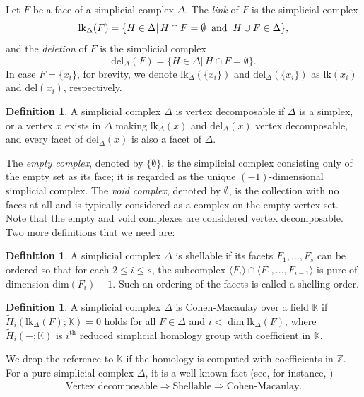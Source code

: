 \documentclass[12pt,reqno]{amsart}
\theoremstyle{definition}
\newtheorem{definition}[proposition]{Definition}
\def\l{\langle}
\def\r{\rangle}
\begin{document}
	Let $F$ be a face of a simplicial complex $\Delta$. The {\it link} of $F$ is the simplicial complex \[\mathrm{lk}_{\Delta}(F)=\{H \in \Delta|\,H \cap F =\emptyset \hspace{2mm}\text{and}\hspace{2mm} H \cup F \in \Delta \},\]
	and the {\it deletion} of $F$ is the simplicial complex \[\mathrm{del}_{\Delta}(F)=\{ H \in \Delta|\,H \cap F =\emptyset \}.\] 
	In case $F=\{x_i\}$, for brevity, we denote $\mathrm{lk}_{\Delta}(\{x_i\})$ and $\mathrm{del}_{\Delta}(\{x_i\})$ as $\mathrm{lk}(x_i)$ and $\mathrm{del}(x_i)$, respectively. 
	\begin{definition}
		A simplicial complex $\Delta$ is vertex decomposable if $\Delta$ is a simplex, or a vertex $x$ exists in $\Delta$ making $\mathrm{lk}_{\Delta}(x)$ and $\mathrm{del}_{\Delta}(x)$ vertex decomposable, and every facet of $\mathrm{del}_{\Delta}(x)$ is also a facet of $\Delta$.
	\end{definition}
    The {\it empty complex}, denoted by $\{\emptyset\}$, is the simplicial complex consisting only of the empty set as its face; it is regarded as the unique $(-1)$-dimensional simplicial complex.
The {\it void complex}, denoted by $\emptyset$, is the collection with no faces at all and is typically considered as a complex on the empty vertex set.
	Note that the empty and void complexes are considered vertex decomposable. Two more definitions that we need are:
	\begin{definition}
		A simplicial complex $\Delta$ is shellable if its facets $F_1,\ldots,F_s$ can be ordered so that for each $2\le i\le s$, the subcomplex $\l F_i\r\cap \l F_1,\ldots,F_{i-1}\r$ is pure of dimension $\mathrm{dim}(F_i)-1$. Such an ordering of the facets is called a shelling order.
	\end{definition}
	
	\begin{definition}
		A simplicial complex $\Delta$ is Cohen-Macaulay over a field $\mathbb K$ if $\widetilde{H}_i(\mathrm{lk}_{\Delta}(F);\mathbb{K})=0$ holds for all $F\in\Delta$ and $i < \dim \mathrm{lk}_{\Delta} (F)$, where $\widetilde{H}_i(-;\mathbb{K})$ is $i^{\text{th}}$ reduced simplicial homology group with coefficient in $\mathbb K$.   
	\end{definition}
	We drop the reference to $\mathbb{K}$ if the homology is computed with coefficients in $\mathbb{Z}$. 
	For a pure simplicial complex $\Delta$, it is a well-known fact (see, for instance, \cite[Proposition 6.3.32]{RHVBook})
	\begin{align}\label{VdShCm}
		\text{Vertex decomposable}\Rightarrow \text{Shellable}\Rightarrow \text{Cohen-Macaulay}.
	\end{align}
\end{document}

